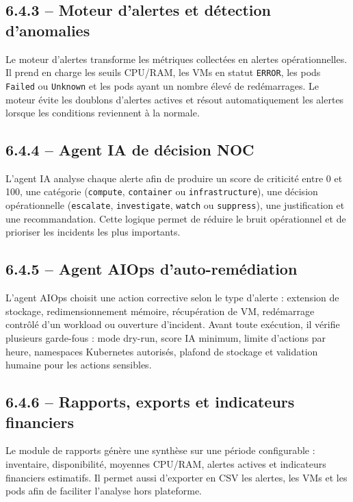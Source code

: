 \documentclass[11pt,a4paper]{report}
\begin{document}
\subsection*{6.4.3 -- Moteur d'alertes et détection d'anomalies}

Le moteur d'alertes transforme les métriques collectées en alertes
opérationnelles. Il prend en charge les seuils CPU/RAM, les VMs en statut
\texttt{ERROR}, les pods \texttt{Failed} ou \texttt{Unknown} et les pods ayant
un nombre élevé de redémarrages. Le moteur évite les doublons d'alertes
actives et résout automatiquement les alertes lorsque les conditions
reviennent à la normale.

\subsection*{6.4.4 -- Agent IA de décision NOC}

L'agent IA analyse chaque alerte afin de produire un score de criticité entre
0 et 100, une catégorie (\texttt{compute}, \texttt{container} ou
\texttt{infrastructure}), une décision opérationnelle
(\texttt{escalate}, \texttt{investigate}, \texttt{watch} ou
\texttt{suppress}), une justification et une recommandation. Cette logique
permet de réduire le bruit opérationnel et de prioriser les incidents les plus
importants.

\subsection*{6.4.5 -- Agent AIOps d'auto-remédiation}

L'agent AIOps choisit une action corrective selon le type d'alerte :
extension de stockage, redimensionnement mémoire, récupération de VM,
redémarrage contrôlé d'un workload ou ouverture d'incident. Avant toute
exécution, il vérifie plusieurs garde-fous : mode dry-run, score IA minimum,
limite d'actions par heure, namespaces Kubernetes autorisés, plafond de
stockage et validation humaine pour les actions sensibles.

\subsection*{6.4.6 -- Rapports, exports et indicateurs financiers}

Le module de rapports génère une synthèse sur une période configurable :
inventaire, disponibilité, moyennes CPU/RAM, alertes actives et indicateurs
financiers estimatifs. Il permet aussi d'exporter en CSV les alertes, les VMs
et les pods afin de faciliter l'analyse hors plateforme.
\end{document}
